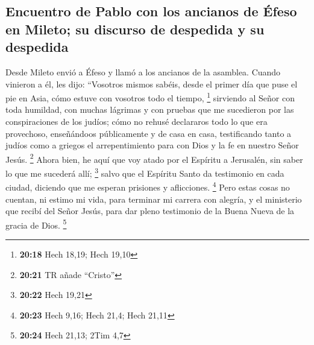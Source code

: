 \begin{paracol}{2}
{\subsection{Encuentro de Pablo con los ancianos de Éfeso en Mileto; su
discurso de despedida y su
despedida}\label{encuentro-de-pablo-con-los-ancianos-de-uxe9feso-en-mileto-su-discurso-de-despedida-y-su-despedida}}

 Desde Mileto envió a Éfeso y llamó a los ancianos de la
asamblea.  Cuando vinieron a él, les dijo: ``Vosotros
mismos sabéis, desde el primer día que puse el pie en Asia, cómo estuve
con vosotros todo el tiempo, \footnote{\textbf{20:18} Hech 18,19; Hech
  19,10}  sirviendo al Señor con toda humildad, con
muchas lágrimas y con pruebas que me sucedieron por las conspiraciones
de los judíos;  cómo no rehusé declararos todo lo que era
provechoso, enseñándoos públicamente y de casa en casa, 
testificando tanto a judíos como a griegos el arrepentimiento para con
Dios y la fe en nuestro Señor Jesús. \footnote{\textbf{20:21} TR añade
  ``Cristo''}  Ahora bien, he aquí que voy atado por el
Espíritu a Jerusalén, sin saber lo que me sucederá allí; \footnote{\textbf{20:22}
  Hech 19,21}  salvo que el Espíritu Santo da testimonio
en cada ciudad, diciendo que me esperan prisiones y aflicciones.
\footnote{\textbf{20:23} Hech 9,16; Hech 21,4; Hech 21,11}
 Pero estas cosas no cuentan, ni estimo mi vida, para
terminar mi carrera con alegría, y el ministerio que recibí del Señor
Jesús, para dar pleno testimonio de la Buena Nueva de la gracia de Dios.
\footnote{\textbf{20:24} Hech 21,13; 2Tim 4,7}


\end{paracol}
